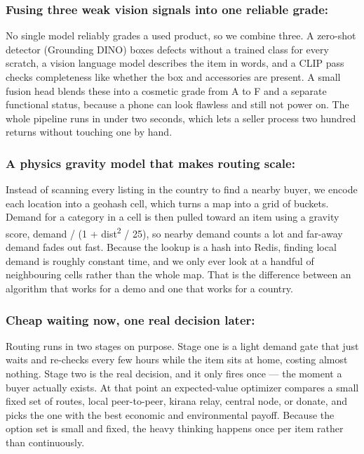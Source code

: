 \documentclass[11pt]{article}
\newcommand{\placeholder}[1]{{\color{placeGray} #1}}
\begin{document}
\subsubsection*{\color{amznSlate} Fusing three weak vision signals into one reliable grade:}
\placeholder{No single model reliably grades a used product, so we combine three. A zero-shot detector (Grounding DINO) boxes defects without a trained class for every scratch, a vision language model describes the item in words, and a CLIP pass checks completeness like whether the box and accessories are present. A small fusion head blends these into a cosmetic grade from A to F and a separate functional status, because a phone can look flawless and still not power on. The whole pipeline runs in under two seconds, which lets a seller process two hundred returns without touching one by hand.}

\subsubsection*{\color{amznSlate} A physics gravity model that makes routing scale:}
\placeholder{Instead of scanning every listing in the country to find a nearby buyer, we encode each location into a geohash cell, which turns a map into a grid of buckets. Demand for a category in a cell is then pulled toward an item using a gravity score, demand / (1 + dist\textsuperscript{2} / 25), so nearby demand counts a lot and far-away demand fades out fast. Because the lookup is a hash into Redis, finding local demand is roughly constant time, and we only ever look at a handful of neighbouring cells rather than the whole map. That is the difference between an algorithm that works for a demo and one that works for a country.}

\subsubsection*{\color{amznSlate} Cheap waiting now, one real decision later:}
\placeholder{Routing runs in two stages on purpose. Stage one is a light demand gate that just waits and re-checks every few hours while the item sits at home, costing almost nothing. Stage two is the real decision, and it only fires once --- the moment a buyer actually exists. At that point an expected-value optimizer compares a small fixed set of routes, local peer-to-peer, kirana relay, central node, or donate, and picks the one with the best economic and environmental payoff. Because the option set is small and fixed, the heavy thinking happens once per item rather than continuously.}
\end{document}
